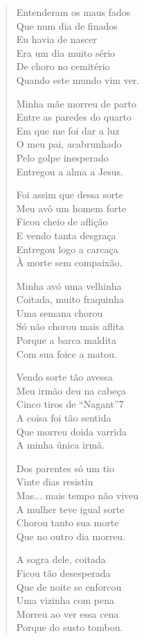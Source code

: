 \begin{verse}
Entenderam os maus fados\\
Que num dia de finados\\
Eu havia de nascer\\
Era um dia muito sério\\
De choro no cemitério\\
Quando este mundo vim ver.

Minha mãe morreu de parto\\
Entre as paredes do quarto\\
Em que me foi dar a luz\\
O meu pai, acabrunhado\\
Pelo golpe inesperado\\
Entregou a alma a Jesus.

Foi assim que dessa sorte\\
Meu avô um homem forte\\
Ficou cheio de aflição\\
E vendo tanta desgraça\\
Entregou logo a carcaça\\
À morte sem compaixão.
\pagebreak

Minha avó uma velhinha\\
Coitada, muito fraquinha\\
Uma semana chorou\\
Só não chorou mais aflita\\
Porque a barca  maldita\\
Com sua foice a matou.

Vendo sorte tão avessa\\
Meu irmão deu na cabeça\\
Cinco tiros de “Nagant”7 \\
A coisa foi tão sentida\\
Que morreu doida varrida\\
A minha única irmã.

Dos parentes só um tio\\
Vinte dias resistiu\\
Mas... mais tempo não viveu\\
A mulher teve igual sorte\\
Chorou tanto sua morte\\
Que no outro dia morreu.

A sogra dele, coitada\\
Ficou tão desesperada\\
Que de noite se enforcou\\
Uma vizinha com pena\\
Morreu ao ver essa cena\\
Porque do susto tombou.
\pagebreak


\end{verse}
